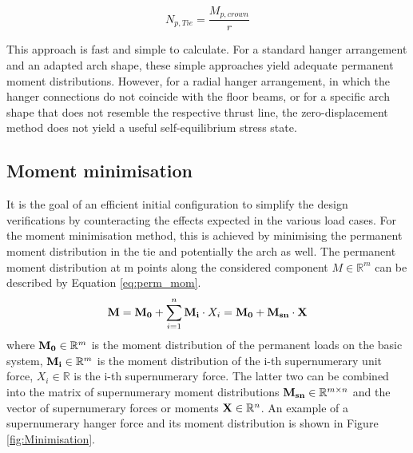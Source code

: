 \begin{equation}
    N_{p,Tie} = \frac{M_{p,crown}}{r}
    \label{eq:M_0}
\end{equation}

This approach is fast and simple to calculate. For a standard hanger arrangement and an adapted arch shape, these simple approaches yield adequate permanent moment distributions. However, for a radial hanger arrangement, in which the hanger connections do not coincide with the floor beams, or for a specific arch shape that does not resemble the respective thrust line, the zero-displacement method does not yield a useful self-equilibrium stress state.

\subsection{Moment minimisation}
It is the goal of an efficient initial configuration to simplify the design verifications by counteracting the effects expected in the various load cases. For the moment minimisation method, this is achieved by minimising the permanent moment distribution in the tie and potentially the arch as well. The permanent moment distribution at m points along the considered component $M \in \mathbb{R}^m$ can be described by Equation \eqref{eq:perm_mom}. 
\begin{equation}
    {\bf M} = {\bf M_0} + \sum_{i=1}^{n} {\bf M_i} \cdot X_i = {\bf M_0} + {\bf M_{sn}} \cdot {\bf X}
    \label{eq:perm_mom}
\end{equation}
where ${\bf M_0} \in \mathbb{R}^m$ is the moment distribution of the permanent loads on the basic system, ${\bf M_i} \in \mathbb{R}^m$ is the moment distribution of the i-th supernumerary unit force, ${X_i} \in \mathbb{R}$ is the i-th supernumerary force. The latter two can be combined into the matrix of supernumerary moment distributions ${\bf M_{sn}} \in  \mathbb{R}^{m\times n}$ and the vector of supernumerary forces or moments ${\bf X} \in \mathbb{R}^n$. An example of a supernumerary hanger force and its moment distribution is shown in Figure \ref{fig:Minimisation}.


